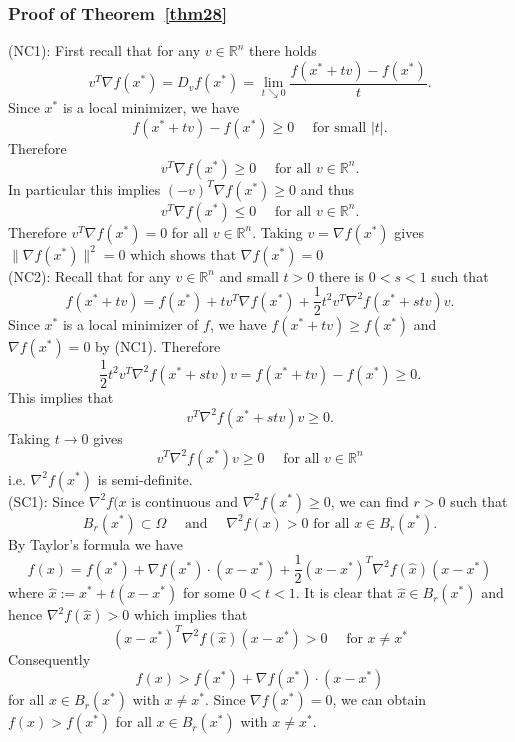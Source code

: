\subsubsection{Proof of Theorem~\ref{thm28}}
\label{appendix:thm28}
(NC1): First recall that for any $v \in \mathbb{R}^n$ there holds
$$
v^{T} \nabla f\left(x^{*}\right)=D_{v} f\left(x^{*}\right)=\lim _{t \searrow 0} \frac{f\left(x^{*}+t v\right)-f\left(x^{*}\right)}{t}.
$$
Since $x^*$ is a local minimizer, we have
$$
f\left(x^{*}+t v\right)-f\left(x^{*}\right) \geq 0 \quad \textrm { for small }|t|.
$$
Therefore
$$
v^{T} \nabla f\left(x^{*}\right) \geq 0 \quad \textrm { for all } v \in \mathbb{R}^{n}.
$$
In particular this implies $(-v)^{T} \nabla f\left(x^{*}\right) \geq 0$ and thus 
$$
v^{T} \nabla f\left(x^{*}\right) \leq 0 \quad \textrm { for all } v \in \mathbb{R}^{n}.
$$
Therefore $v^{T} \nabla f(x^{*})=0$ for all $v \in \mathbb{R}^{n}$. Taking $v=\nabla f(x^*)$ gives $\|\nabla f(x^*)\|^2 = 0$ which shows that $\nabla f(x^{*})=0$ \\
(NC2): Recall that for any $v \in \mathbb{R}^n$ and small $t > 0$ there is $0 < s < 1$ such that 
$$
f\left(x^{*}+t v\right)=f\left(x^{*}\right)+t v^{T} \nabla f\left(x^{*}\right)+\frac{1}{2} t^{2} v^{T} \nabla^{2} f\left(x^{*}+s t v\right) v.
$$
Since $x^*$ is a local minimizer of $f$, we have $f\left(x^{*}+t v\right) \geq f\left(x^{*}\right)$ and $\nabla f(x^{*})=0$ by (NC1). Therefore
$$
\frac{1}{2} t^{2} v^{T} \nabla^{2} f\left(x^{*}+s t v\right) v=f\left(x^{*}+t v\right)-f\left(x^{*}\right) \geq 0 .
$$
This implies that
$$
v^{T} \nabla^{2} f\left(x^{*}+s t v\right) v \geq 0.
$$
Taking $t \rightarrow 0$ gives
$$
v^{T} \nabla^{2} f\left(x^{*}\right) v \geq 0 \quad \textrm { for all } v \in \mathbb{R}^{n}
$$ 
i.e. $\nabla^2 f(x^*)$ is semi-definite.\\
(SC1): Since $\nabla^2 f(x$ is continuous and $\nabla^2 f(x^*) \geq 0$, we can find $r > 0$ such that
$$
B_{r}\left(x^{*}\right) \subset \Omega \quad \textrm { and } \quad \nabla^{2} f(x)>0 \textrm { for all } x \in B_{r}\left(x^{*}\right).
$$
By Taylor’s formula we have
$$
f(x)=f\left(x^{*}\right)+\nabla f\left(x^{*}\right) \cdot\left(x-x^{*}\right)+\frac{1}{2}\left(x-x^{*}\right)^{T} \nabla^{2} f(\hat{x})\left(x-x^{*}\right)
$$
where $\hat{x} := x^* + t(x - x^*)$ for some $0 < t < 1$.
It is clear that $\hat{x} \in B_{r}\left(x^{*}\right)$ and hence $\nabla^2f(\hat{x}) > 0$ which implies that 
$$
\left(x-x^{*}\right)^{T} \nabla^{2} f(\hat{x})\left(x-x^{*}\right)>0 \quad \textrm { for } x \neq x^{*}
$$
Consequently
$$
f(x)>f\left(x^{*}\right)+\nabla f\left(x^{*}\right) \cdot\left(x-x^{*}\right)
$$
for all $x \in B_{r}\left(x^{*}\right)$ with $x \neq x^*$. Since $\nabla f(x^*) = 0$, we can obtain $f(x) > f(x^*)$ for all $x \in B_{r}\left(x^{*}\right)$ with $x \neq x^*$. 

